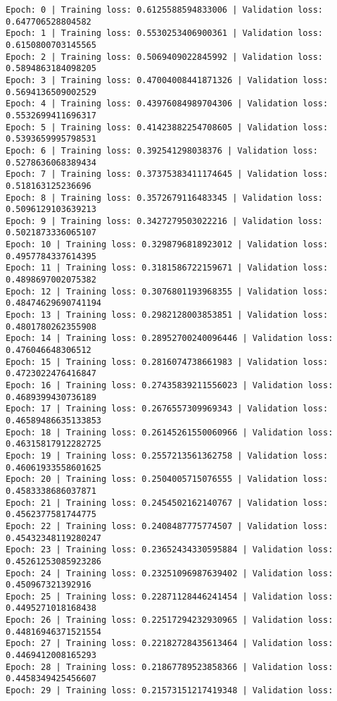 \documentclass[11pt]{article}
\begin{document}
    \begin{Verbatim}[commandchars=\\\{\}]
Epoch: 0 | Training loss: 0.6125588594833006 | Validation loss:
0.647706528804582
Epoch: 1 | Training loss: 0.5530253406900361 | Validation loss:
0.6150800703145565
Epoch: 2 | Training loss: 0.5069409022845992 | Validation loss:
0.5894863184098205
Epoch: 3 | Training loss: 0.47004008441871326 | Validation loss:
0.5694136509002529
Epoch: 4 | Training loss: 0.43976084989704306 | Validation loss:
0.5532699411696317
Epoch: 5 | Training loss: 0.41423882254708605 | Validation loss:
0.5393659995798531
Epoch: 6 | Training loss: 0.392541298038376 | Validation loss:
0.5278636068389434
Epoch: 7 | Training loss: 0.37375383411174645 | Validation loss:
0.518163125236696
Epoch: 8 | Training loss: 0.3572679116483345 | Validation loss:
0.5096129103639213
Epoch: 9 | Training loss: 0.3427279503022216 | Validation loss:
0.5021873336065107
Epoch: 10 | Training loss: 0.3298796818923012 | Validation loss:
0.4957784337614395
Epoch: 11 | Training loss: 0.3181586722159671 | Validation loss:
0.4898697002075382
Epoch: 12 | Training loss: 0.3076801193968355 | Validation loss:
0.48474629690741194
Epoch: 13 | Training loss: 0.2982128003853851 | Validation loss:
0.4801780262355908
Epoch: 14 | Training loss: 0.28952700240096446 | Validation loss:
0.476046648306512
Epoch: 15 | Training loss: 0.2816074738661983 | Validation loss:
0.4723022476416847
Epoch: 16 | Training loss: 0.27435839211556023 | Validation loss:
0.4689399430736189
Epoch: 17 | Training loss: 0.2676557309969343 | Validation loss:
0.46589486635133853
Epoch: 18 | Training loss: 0.26145261550060966 | Validation loss:
0.46315817912282725
Epoch: 19 | Training loss: 0.2557213561362758 | Validation loss:
0.46061933558601625
Epoch: 20 | Training loss: 0.2504005715076555 | Validation loss:
0.4583338686037871
Epoch: 21 | Training loss: 0.2454502162140767 | Validation loss:
0.4562377581744775
Epoch: 22 | Training loss: 0.2408487775774507 | Validation loss:
0.45432348119280247
Epoch: 23 | Training loss: 0.23652434330595884 | Validation loss:
0.45261253085923286
Epoch: 24 | Training loss: 0.23251096987639402 | Validation loss:
0.450967321392916
Epoch: 25 | Training loss: 0.22871128446241454 | Validation loss:
0.4495271018168438
Epoch: 26 | Training loss: 0.22517294232930965 | Validation loss:
0.44816946371521554
Epoch: 27 | Training loss: 0.22182728435613464 | Validation loss:
0.4469412008165293
Epoch: 28 | Training loss: 0.21867789523858366 | Validation loss:
0.4458349425456607
Epoch: 29 | Training loss: 0.21573151217419348 | Validation loss:

\end{Verbatim}
\end{document}
